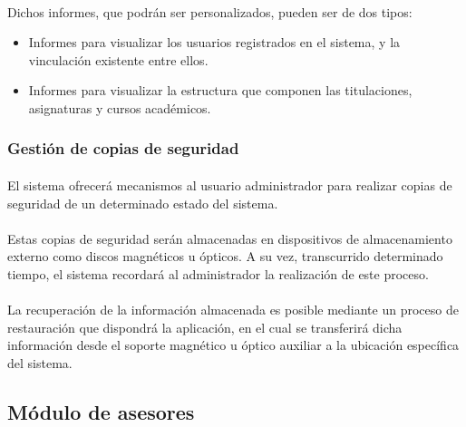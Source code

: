       \paragraph{}Dichos informes, que podrán ser personalizados, pueden ser
      de dos tipos:

      \begin{itemize}
       \item Informes para visualizar los usuarios registrados en el sistema, y
             la vinculación existente entre ellos.
       \item Informes para visualizar la estructura que componen las
             titulaciones, asignaturas y cursos académicos.
      \end{itemize}

      \subsubsection{Gestión de copias de seguridad}

      \paragraph{}El sistema ofrecerá mecanismos al usuario administrador para
      realizar copias de seguridad de un determinado estado del sistema.

      \paragraph{}Estas copias de seguridad serán almacenadas en dispositivos
      de almacenamiento externo como discos magnéticos u ópticos. A su vez,
      transcurrido determinado tiempo, el sistema recordará al administrador
      la realización de este proceso.

      \paragraph{}La recuperación de la información almacenada es posible
      mediante un proceso de restauración que dispondrá la aplicación, en el
      cual se transferirá dicha información desde el soporte magnético u
      óptico auxiliar a la ubicación específica del sistema.

   \subsection{Módulo de asesores}

